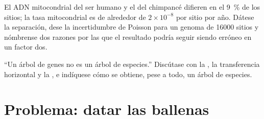 \begin{exercise}[$\star\star\star$]\label{exo:b2:phylogenetic-trees:11}
El ADN mitocondrial del ser humano y el del chimpancé difieren en el
\qty{9}{\%} de los sitios; la tasa mitocondrial es de alrededor de
$2\times 10^{-8}$ por sitio por año. Dátese la separación, dese la
incertidumbre de Poisson para un genoma de \qty{16000}{} sitios y
nómbrense dos razones por las que el resultado podría seguir siendo
erróneo en un factor dos.
\end{exercise}

\begin{exercise}[$\star\star\star$]\label{exo:b2:phylogenetic-trees:12}
``Un árbol de genes no es un árbol de especies.'' Discútase con la
, la transferencia horizontal y la
, e indíquese cómo se obtiene, pese a todo, un árbol de
especies.
\end{exercise}

\section{Problema: datar las ballenas}


